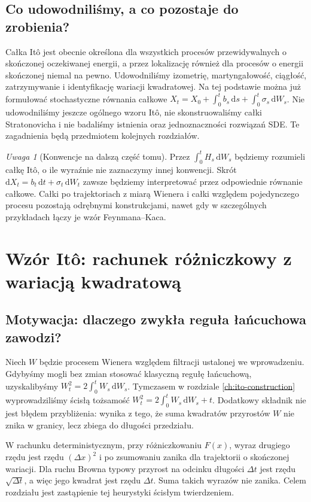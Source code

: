 \documentclass[11pt,a4paper,oneside]{report}
\numberwithin{equation}{chapter}
\theoremstyle{plain}
\theoremstyle{definition}
\theoremstyle{remark}
\newtheorem{uwaga}{Uwaga}[chapter]
\newcommand{\dd}{\mathrm{d}}
\begin{document}
\section{Co udowodniliśmy, a co pozostaje do zrobienia?}
Całka Itô jest obecnie określona dla wszystkich
procesów przewidywalnych o skończonej oczekiwanej energii,
a przez lokalizację również dla procesów o energii
skończonej niemal na pewno. Udowodniliśmy izometrię,
martyngałowość, ciągłość, zatrzymywanie i identyfikację
wariacji kwadratowej. Na tej podstawie można już
formułować stochastyczne równania całkowe
$X_t=X_0+\int_0^tb_s\,\dd s+\int_0^t\sigma_s\,\dd W_s$.
Nie udowodniliśmy jeszcze ogólnego wzoru Itô,
nie skonstruowaliśmy całki Stratonovicha i nie badaliśmy
istnienia oraz jednoznaczności rozwiązań SDE.
Te zagadnienia będą przedmiotem kolejnych rozdziałów.

\begin{uwaga}[Konwencje na dalszą część tomu]
Przez $\int_0^tH_s\,\dd W_s$ będziemy rozumieli
całkę Itô, o ile wyraźnie nie zaznaczymy innej
konwencji. Skrót $\dd X_t=b_t\,\dd t+\sigma_t\,\dd W_t$
zawsze będziemy interpretować przez odpowiednie
równanie całkowe. Całki po trajektoriach z miarą
Wienera i całki względem pojedynczego procesu
pozostają odrębnymi konstrukcjami, nawet gdy
w szczególnych przykładach łączy je wzór Feynmana--Kaca.
\end{uwaga}
\chapter{Wzór Itô: rachunek różniczkowy z wariacją kwadratową}
\label{ch:ito-formula}

\section{Motywacja: dlaczego zwykła reguła łańcuchowa zawodzi?}
Niech $W$ będzie procesem Wienera względem filtracji ustalonej
we wprowadzeniu. Gdybyśmy mogli bez zmian stosować klasyczną
regułę łańcuchową, uzyskalibyśmy
$W_t^2=2\int_0^tW_s\,\dd W_s$. Tymczasem w rozdziale
\ref{ch:ito-construction} wyprowadziliśmy ścisłą tożsamość
$W_t^2=2\int_0^tW_s\,\dd W_s+t$.
Dodatkowy składnik nie jest błędem przybliżenia: wynika z tego,
że suma kwadratów przyrostów $W$ nie znika w granicy, lecz
zbiega do długości przedziału.

W rachunku deterministycznym, przy różniczkowaniu $F(x)$,
wyraz drugiego rzędu jest rzędu $(\Delta x)^2$ i po
zsumowaniu zanika dla trajektorii o skończonej wariacji.
Dla ruchu Browna typowy przyrost na odcinku długości
$\Delta t$ jest rzędu $\sqrt{\Delta t}$, a więc jego
kwadrat jest rzędu $\Delta t$. Suma takich wyrazów nie
zanika. Celem rozdziału jest zastąpienie tej heurystyki
ścisłym twierdzeniem.
\end{document}

